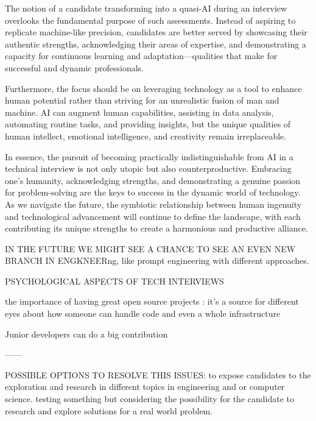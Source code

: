 \documentclass[
    a4paper, %
    10pt, %
    unnumberedsections, %
    twoside, %
]{LTJournalArticle}
\begin{document}
The notion of a candidate transforming into a quasi-AI during an interview overlooks the fundamental purpose of such assessments. Instead of aspiring to replicate machine-like precision, candidates are better served by showcasing their authentic strengths, acknowledging their areas of expertise, and demonstrating a capacity for continuous learning and adaptation—qualities that make for successful and dynamic professionals.

Furthermore, the focus should be on leveraging technology as a tool to enhance human potential rather than striving for an unrealistic fusion of man and machine. AI can augment human capabilities, assisting in data analysis, automating routine tasks, and providing insights, but the unique qualities of human intellect, emotional intelligence, and creativity remain irreplaceable.

In essence, the pursuit of becoming practically indistinguishable from AI in a technical interview is not only utopic but also counterproductive. Embracing one's humanity, acknowledging strengths, and demonstrating a genuine passion for problem-solving are the keys to success in the dynamic world of technology. As we navigate the future, the symbiotic relationship between human ingenuity and technological advancement will continue to define the landscape, with each contributing its unique strengths to create a harmonious and productive alliance.





IN THE FUTURE WE MIGHT SEE A CHANCE TO SEE AN EVEN NEW BRANCH IN ENGKNEERng, like prompt engineering with different approaches.


PSYCHOLOGICAL ASPECTS OF TECH INTERVIEWS 




the importance of having great open source projects : it's a source for different eyes about how someone can handle code and even a whole infrastructure 


Junior developers can do a big contribution 





——


POSSIBLE OPTIONS TO RESOLVE THIS ISSUES:
to expose candidates to the exploration and research in different topics in engineering and or computer science. testing something but considering the possibility for the candidate to research and explore solutions for a real world problem. 
\end{document}
